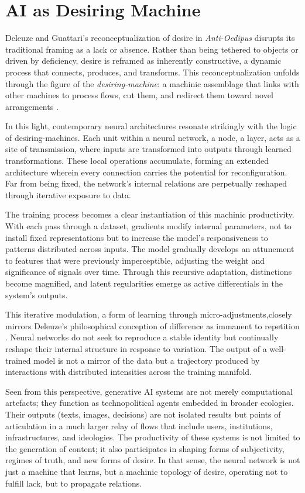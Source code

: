 \section{AI as Desiring Machine}

Deleuze and Guattari’s reconceptualization of desire in \textit{Anti-Oedipus} disrupts its traditional framing as a lack or absence. Rather than being tethered to objects or driven by deficiency, desire is reframed as inherently constructive, a dynamic process that connects, produces, and transforms. This reconceptualization unfolds through the figure of the \textit{desiring-machine}: a machinic assemblage that links with other machines to process flows, cut them, and redirect them toward novel arrangements \parencite{deleuze1983}.

In this light, contemporary neural architectures resonate strikingly with the logic of desiring-machines. Each unit within a neural network, a node, a layer, acts as a site of transmission, where inputs are transformed into outputs through learned transformations. These local operations accumulate, forming an extended architecture wherein every connection carries the potential for reconfiguration. Far from being fixed, the network’s internal relations are perpetually reshaped through iterative exposure to data.

The training process becomes a clear instantiation of this machinic productivity. With each pass through a dataset, gradients modify internal parameters, not to install fixed representations but to increase the model’s responsiveness to patterns distributed across inputs. The model gradually develops an attunement to features that were previously imperceptible, adjusting the weight and significance of signals over time. Through this recursive adaptation, distinctions become magnified, and latent regularities emerge as active differentials in the system’s outputs.

This iterative modulation, a form of learning through micro-adjustments,closely mirrors Deleuze’s philosophical conception of difference as immanent to repetition \parencite{deleuze1994}. Neural networks do not seek to reproduce a stable identity but continually reshape their internal structure in response to variation. The output of a well-trained model is not a mirror of the data but a trajectory produced by interactions with distributed intensities across the training manifold.

Seen from this perspective, generative AI systems are not merely computational artefacts; they function as technopolitical agents embedded in broader ecologies. Their outputs (texts, images, decisions) are not isolated results but points of articulation in a much larger relay of flows that include users, institutions, infrastructures, and ideologies. The productivity of these systems is not limited to the generation of content; it also participates in shaping forms of subjectivity, regimes of truth, and new forms of desire. In that sense, the neural network is not just a machine that learns, but a machinic topology of desire, operating not to fulfill lack, but to propagate relations.

